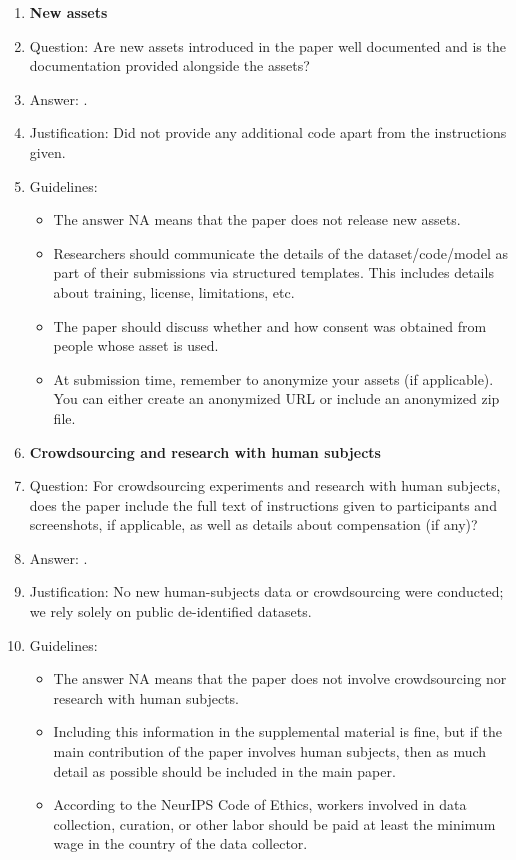 \documentclass{article}
\begin{document}
\begin{enumerate}
\item {\bf New assets}
    \item[] Question: Are new assets introduced in the paper well documented and is the documentation provided alongside the assets?
    \item[] Answer: \answerNA{}.
    \item[] Justification: Did not provide any additional code apart from the instructions given.
    \item[] Guidelines:
    \begin{itemize}
        \item The answer NA means that the paper does not release new assets.
        \item Researchers should communicate the details of the dataset/code/model as part of their submissions via structured templates. This includes details about training, license, limitations, etc. 
        \item The paper should discuss whether and how consent was obtained from people whose asset is used.
        \item At submission time, remember to anonymize your assets (if applicable). You can either create an anonymized URL or include an anonymized zip file.
    \end{itemize}

\item {\bf Crowdsourcing and research with human subjects}
    \item[] Question: For crowdsourcing experiments and research with human subjects, does the paper include the full text of instructions given to participants and screenshots, if applicable, as well as details about compensation (if any)? 
    \item[] Answer: \answerNA{}.
    \item[] Justification: No new human-subjects data or crowdsourcing were conducted; we rely solely on public de-identified datasets.
    \item[] Guidelines:
    \begin{itemize}
        \item The answer NA means that the paper does not involve crowdsourcing nor research with human subjects.
        \item Including this information in the supplemental material is fine, but if the main contribution of the paper involves human subjects, then as much detail as possible should be included in the main paper. 
        \item According to the NeurIPS Code of Ethics, workers involved in data collection, curation, or other labor should be paid at least the minimum wage in the country of the data collector. 
    \end{itemize}


\end{enumerate}
\end{document}
